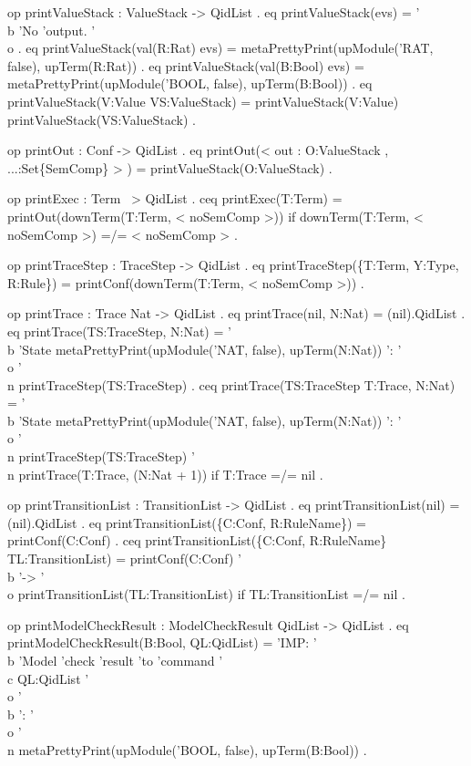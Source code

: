 \documentclass{llncs}%
\begin{document}
 op printValueStack : ValueStack -> QidList .
 eq printValueStack(evs) = '\\b 'No 'output. '\\o .
 eq printValueStack(val(R:Rat) evs) =
    metaPrettyPrint(upModule('RAT, false), upTerm(R:Rat)) .
 eq printValueStack(val(B:Bool) evs) =
    metaPrettyPrint(upModule('BOOL, false), upTerm(B:Bool)) .
 eq printValueStack(V:Value VS:ValueStack) =
    printValueStack(V:Value) printValueStack(VS:ValueStack) .
 
 op printOut : Conf -> QidList .
 eq printOut(< out : O:ValueStack , ...:Set\{SemComp\} > ) =
    printValueStack(O:ValueStack) .

 op printExec : Term ~> QidList .
ceq printExec(T:Term) = printOut(downTerm(T:Term, < noSemComp >))
 if downTerm(T:Term, < noSemComp >) =/= < noSemComp > .

 op printTraceStep : TraceStep -> QidList .
 eq printTraceStep(\{T:Term, Y:Type, R:Rule\}) =
    printConf(downTerm(T:Term, < noSemComp >)) .

 op printTrace : Trace Nat -> QidList .
 eq printTrace(nil, N:Nat) = (nil).QidList .
 eq printTrace(TS:TraceStep, N:Nat) =
    '\\b 'State 
    metaPrettyPrint(upModule('NAT, false), 
     upTerm(N:Nat)) ': '\\o '\\n
    printTraceStep(TS:TraceStep) .
ceq printTrace(TS:TraceStep T:Trace, N:Nat) =
    '\\b 'State 
    metaPrettyPrint(upModule('NAT, false), 
     upTerm(N:Nat)) ': '\\o '\\n
    printTraceStep(TS:TraceStep) '\\n printTrace(T:Trace, (N:Nat + 1))
 if T:Trace =/= nil .

 op printTransitionList : TransitionList -> QidList .
 eq printTransitionList(nil) = (nil).QidList .
 eq printTransitionList(\{C:Conf, R:RuleName\}) = printConf(C:Conf) .
ceq printTransitionList(\{C:Conf, R:RuleName\} TL:TransitionList) =
    printConf(C:Conf) '\\b '-> '\\o printTransitionList(TL:TransitionList)
 if TL:TransitionList =/= nil .

 op printModelCheckResult : ModelCheckResult QidList -> QidList .
 eq printModelCheckResult(B:Bool, QL:QidList) =
    'IMP: '\\b 'Model 'check 'result 'to 'command 
    '\\c QL:QidList '\\o '\\b ': '\\o '\\n
        metaPrettyPrint(upModule('BOOL, false), upTerm(B:Bool)) .
\end{document}
